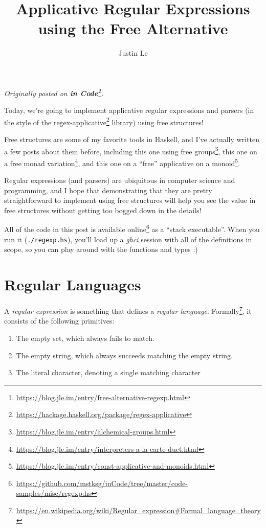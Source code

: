 \documentclass[]{article}
\title{Applicative Regular Expressions using the Free Alternative}
\author{Justin Le}
\renewcommand{\href}[2]{#2\footnote{\url{#1}}}
\begin{document}
\maketitle

\emph{Originally posted on
\textbf{\href{https://blog.jle.im/entry/free-alternative-regexp.html}{in
Code}}.}

Today, we're going to implement applicative regular expressions and parsers (in
the style of the
\href{https://hackage.haskell.org/package/regex-applicative}{regex-applicative}
library) using free structures!

Free structures are some of my favorite tools in Haskell, and I've actually
written a few posts about them before, including
\href{https://blog.jle.im/entry/alchemical-groups.html}{this one using free
groups}, \href{https://blog.jle.im/entry/interpreters-a-la-carte-duet.html}{this
one on a free monad variation}, and
\href{https://blog.jle.im/entry/const-applicative-and-monoids.html}{this one on
a ``free'' applicative on a monoid}.

Regular expressions (and parsers) are ubiquitous in computer science and
programming, and I hope that demonstrating that they are pretty straightforward
to implement using free structures will help you see the value in free
structures without getting too bogged down in the details!

All of the code in this post is
\href{https://github.com/mstksg/inCode/tree/master/code-samples/misc/regexp.hs}{available
online} as a ``stack executable''. When you run it (\texttt{./regexp.hs}),
you'll load up a \emph{ghci} session with all of the definitions in scope, so
you can play around with the functions and types :)

\hypertarget{regular-languages}{%
\section{Regular Languages}\label{regular-languages}}

A \emph{regular expression} is something that defines a \emph{regular language}.
\href{https://en.wikipedia.org/wiki/Regular_expression\#Formal_language_theory}{Formally},
it consists of the following primitives:

\begin{enumerate}
\def\labelenumi{\arabic{enumi}.}
\tightlist
\item
  The empty set, which always fails to match.
\item
  The empty string, which always succeeds matching the empty string.
\item
  The literal character, denoting a single matching character
\end{enumerate}
\end{document}

